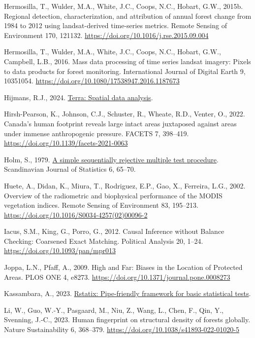 \documentclass[
]{agujournal2019}
\newlength{\cslhangindent}
\newenvironment{CSLReferences}[2] %
 {\begin{list}{}{%
  \setlength{\itemindent}{0pt}
  \setlength{\leftmargin}{0pt}
  \setlength{\parsep}{0pt}
  \ifodd #1
   \setlength{\leftmargin}{\cslhangindent}
   \setlength{\itemindent}{-1\cslhangindent}
  \fi
  \setlength{\itemsep}{#2\baselineskip}}}
 {\end{list}}
\begin{document}
\begin{CSLReferences}{1}{0}
Hermosilla, T., Wulder, M.A., White, J.C., Coops, N.C., Hobart, G.W.,
2015b. Regional detection, characterization, and attribution of annual
forest change from 1984 to 2012 using landsat-derived time-series
metrics. Remote Sensing of Environment 170, 121132.
\url{https://doi.org/10.1016/j.rse.2015.09.004}

Hermosilla, T., Wulder, M.A., White, J.C., Coops, N.C., Hobart, G.W.,
Campbell, L.B., 2016. Mass data processing of time series landsat
imagery: Pixels to data products for forest monitoring. International
Journal of Digital Earth 9, 10351054.
\url{https://doi.org/10.1080/17538947.2016.1187673}

Hijmans, R.J., 2024. \href{https://rspatial.org/}{Terra: Spatial data
analysis}.

Hirsh-Pearson, K., Johnson, C.J., Schuster, R., Wheate, R.D., Venter,
O., 2022. Canada{'}s human footprint reveals large intact areas
juxtaposed against areas under immense anthropogenic pressure. FACETS 7,
398--419. \url{https://doi.org/10.1139/facets-2021-0063}

Holm, S., 1979. \href{https://www.jstor.org/stable/4615733}{A simple
sequentially rejective multiple test procedure}. Scandinavian Journal of
Statistics 6, 65--70.

Huete, A., Didan, K., Miura, T., Rodriguez, E.P., Gao, X., Ferreira,
L.G., 2002. Overview of the radiometric and biophysical performance of
the MODIS vegetation indices. Remote Sensing of Environment 83,
195--213. \url{https://doi.org/10.1016/S0034-4257(02)00096-2}

Iacus, S.M., King, G., Porro, G., 2012. Causal Inference without Balance
Checking: Coarsened Exact Matching. Political Analysis 20, 1--24.
\url{https://doi.org/10.1093/pan/mpr013}

Joppa, L.N., Pfaff, A., 2009. High and Far: Biases in the Location of
Protected Areas. PLOS ONE 4, e8273.
\url{https://doi.org/10.1371/journal.pone.0008273}

Kassambara, A., 2023.
\href{https://rpkgs.datanovia.com/rstatix/}{Rstatix: Pipe-friendly
framework for basic statistical tests}.

Li, W., Guo, W.-Y., Pasgaard, M., Niu, Z., Wang, L., Chen, F., Qin, Y.,
Svenning, J.-C., 2023. Human fingerprint on structural density of
forests globally. Nature Sustainability 6, 368--379.
\url{https://doi.org/10.1038/s41893-022-01020-5}


\end{CSLReferences}
\end{document}
